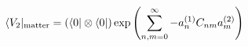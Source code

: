 \begin{equation}
\langle V_2 |_{{\rm matter}} =
\left(\langle 0 | \otimes \langle 0 |\right)
\exp\left( \sum_{n, m = 0}^{ \infty} 
-a_n^{(1)}  C_{nm} a_m^{ (2)} \right)
\label{eq:v2o}
\end{equation}

